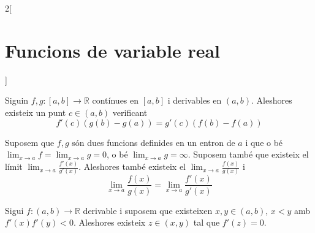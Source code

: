 \documentclass[class=article,10pt,crop=false]{standalone}
\begin{document}
\begin{multicols}{2}[\section{Funcions de variable real}]
\begin{corollary}
\end{corollary}
\begin{theorem}
Siguin $f,g:[a,b]\rightarrow\mathbb{R}$ contínues en $[a,b]$ i derivables en $(a,b)$. Aleshores existeix un punt $c\in (a,b)$ verificant $$f'(c)(g(b)-g(a))=g'(c)(f(b)-f(a))$$
\end{theorem}
\begin{theorem}
Suposem que $f,g$ són dues funcions definides en un entron de $a$ i que o bé $\lim_{x\to a} f=\lim_{x\to a} g=0$, o bé $\lim_{x\to a} g=\infty$. Suposem també que existeix el límit $\lim_{x\to a} \frac{f'(x)}{g'(x)}$. Aleshores també existeix el $\lim_{x\to a} \frac{f(x)}{g(x)}$ i $$\lim_{x\to a} \frac{f(x)}{g(x)}=\lim_{x\to a} \frac{f'(x)}{g'(x)}$$
\end{theorem}
\begin{theorem}
Sigui $f:(a,b)\rightarrow\mathbb{R}$ derivable i suposem que existeixen $x,y\in (a,b)$, $x<y$ amb $f'(x)f'(y)<0$. Aleshores existeix $z\in(x,y)$ tal que $f'(z)=0$. 
\end{theorem}

\end{multicols}
\end{document}
